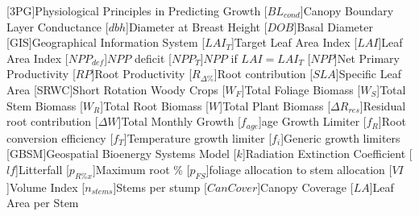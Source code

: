 \usepackage[printonlyused]{acronym}
[\textsc{3PG}]{Physiological Principles in Predicting Growth}
[\ensuremath{BL_{cond}}]{Canopy Boundary Layer Conductance}
[\ensuremath{dbh}]{Diameter at Breast Height}
[\ensuremath{DOB}]{Basal Diameter}
[\textsc{GIS}]{Geographical Information System}
[\ensuremath{LAI_{T}}]{Target Leaf Area Index}
[\ensuremath{LAI}]{Leaf Area Index}
[\ensuremath{NPP_{def}}]{$NPP$ deficit}
[\ensuremath{NPP_{T}}]{$NPP$ if $LAI = LAI_{T}$}
[\ensuremath{NPP}]{Net Primary Productivity}
[\ensuremath{RP}]{Root Productivity}
[\ensuremath{R_{\Delta\%}}]{Root contribution}
[\ensuremath{SLA}]{Specific Leaf Area}
[\textsc{SRWC}]{Short Rotation Woody Crops}
[\ensuremath{W_F}]{Total Foliage Biomass}
[\ensuremath{W_S}]{Total Stem Biomass}
[\ensuremath{W_R}]{Total Root Biomass}
[\ensuremath{W}]{Total Plant Biomass}
[\ensuremath{\Delta R_{res}}]{Residual root contribution}
[\ensuremath{\Delta W}]{Total Monthly Growth}
[\ensuremath{f_{age}}]{age Growth Limiter}
[\ensuremath{f_R}]{Root conversion efficiency}
[\ensuremath{f_T}]{Temperature growth limiter}
[\ensuremath{f_i}]{Generic growth limiters}
[\textsc{GBSM}]{Geospatial Bioenergy Systems Model}
[\ensuremath{k}]{Radiation Extinction Coefficient}
[\ensuremath{lf}]{Litterfall}
[\ensuremath{p_{R\%x}}]{Maximum root \%}
[\ensuremath{p_{FS}}]{foliage allocation to stem allocation}
[\ensuremath{VI}]{Volume Index}
[\ensuremath{n_{stems}}]{Stems per stump}
[\ensuremath{CanCover}]{Canopy Coverage}
[\ensuremath{LA}]{Leaf Area per Stem}

